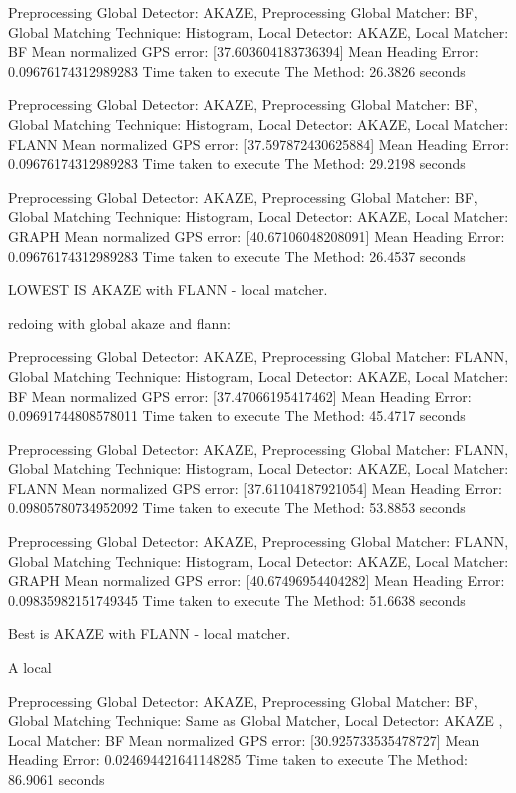 Preprocessing Global Detector: AKAZE, Preprocessing Global Matcher: BF, Global Matching Technique: Histogram, Local Detector: AKAZE, Local Matcher: BF
Mean normalized GPS error: [37.603604183736394]
Mean Heading Error: 0.09676174312989283
Time taken to execute The Method: 26.3826 seconds

Preprocessing Global Detector: AKAZE, Preprocessing Global Matcher: BF, Global Matching Technique: Histogram, Local Detector: AKAZE, Local Matcher: FLANN
Mean normalized GPS error: [37.597872430625884]
Mean Heading Error: 0.09676174312989283
Time taken to execute The Method: 29.2198 seconds


Preprocessing Global Detector: AKAZE, Preprocessing Global Matcher: BF, Global Matching Technique: Histogram, Local Detector: AKAZE, Local Matcher: GRAPH
Mean normalized GPS error: [40.67106048208091]
Mean Heading Error: 0.09676174312989283
Time taken to execute The Method: 26.4537 seconds

LOWEST IS AKAZE with FLANN - local matcher. 

redoing with global akaze and flann:

Preprocessing Global Detector: AKAZE, Preprocessing Global Matcher: FLANN, Global Matching Technique: Histogram, Local Detector: AKAZE, Local Matcher: BF
Mean normalized GPS error: [37.47066195417462]
Mean Heading Error: 0.09691744808578011
Time taken to execute The Method: 45.4717 seconds


Preprocessing Global Detector: AKAZE, Preprocessing Global Matcher: FLANN, Global Matching Technique: Histogram, Local Detector: AKAZE, Local Matcher: FLANN
Mean normalized GPS error: [37.61104187921054]
Mean Heading Error: 0.09805780734952092
Time taken to execute The Method: 53.8853 seconds



Preprocessing Global Detector: AKAZE, Preprocessing Global Matcher: FLANN, Global Matching Technique: Histogram, Local Detector: AKAZE, Local Matcher: GRAPH
Mean normalized GPS error: [40.67496954404282]
Mean Heading Error: 0.09835982151749345
Time taken to execute The Method: 51.6638 seconds

Best is AKAZE with FLANN - local matcher.


A local 

Preprocessing Global Detector: AKAZE, Preprocessing Global Matcher: BF, Global Matching Technique: Same as Global Matcher, Local Detector: AKAZE , Local Matcher: BF
Mean normalized GPS error: [30.925733535478727]
Mean Heading Error: 0.024694421641148285
Time taken to execute The Method: 86.9061 seconds